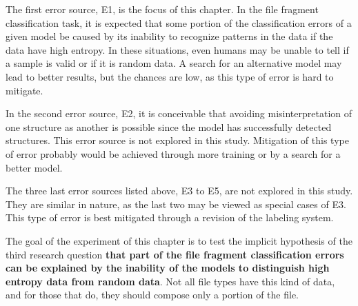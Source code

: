 The first error source, E1, is the focus of this chapter. In the file fragment classification task, it is expected that some portion of the classification errors of a given model be caused by its inability to recognize patterns in the data if the data have high entropy. In these situations, even humans may be unable to tell if a sample is valid or if it is random data. A search for an alternative model may lead to better results, but the chances are low, as this type of error is hard to mitigate. 

In the second error source, E2, it is conceivable that avoiding misinterpretation of one structure as another is possible since the model has successfully detected structures. This error source is not explored in this study. Mitigation of this type of error probably would be achieved through more training or by a search for a better model.

The three last error sources listed above, E3 to E5, are not explored in this study. They are similar in nature, as the last two may be viewed as special cases of E3. This type of error is best mitigated through a revision of the labeling system.

{\color{red}
The goal of the experiment of this chapter is to test the implicit hypothesis of the third research question \textbf{that part of the file fragment classification errors can be explained by the inability of the models to distinguish high entropy data from random data}. Not all file types have this kind of data, and for those that do, they should compose only a portion of the file.
}

